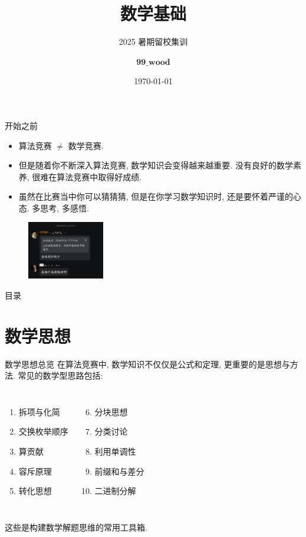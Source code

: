 \documentclass[aspectratio=169]{beamer}  %
\title{数学基础}
\subtitle{2025 暑期留校集训}
\author{$\mathbf{99\_wood}$}
\institute{东北大学\\计算机科学与工程学院}
\date{\today}
\newcommand{\pau}{\pause}
\begin{document}
\begin{frame}
  \titlepage
\end{frame}

\begin{frame}{开始之前}
  \pau
  \begin{itemize}
    \item 算法竞赛 $\neq$ 数学竞赛. \pau
    \item 但是随着你不断深入算法竞赛, 数学知识会变得越来越重要. 没有良好的数学素养, 很难在算法竞赛中取得好成绩. \pau
    \item 虽然在比赛当中你可以猜猜猜, 但是在你学习数学知识时,
          还是要怀着严谨的心态. 多思考, 多感悟.
  \end{itemize}
  \begin{figure}
    \centering
    \includegraphics[width=0.3\textwidth]{./figure/gaoduanjv.jpg}
  \end{figure}
\end{frame}

\begin{frame}{目录}
  \tableofcontents
\end{frame}

\section{数学思想}

\begin{frame}{数学思想总览}
在算法竞赛中, 数学知识不仅仅是公式和定理, 更重要的是\alert{思想与方法}.
常见的数学型思路包括: 
\begin{columns}[t]
    \begin{enumerate}
        \item 拆项与化简
        \item 交换枚举顺序
        \item 算贡献
        \item 容斥原理
        \item 转化思想
    \end{enumerate}

    \begin{enumerate}
        \setcounter{enumi}{5}
        \item 分块思想
        \item 分类讨论
        \item 利用单调性
        \item 前缀和与差分
        \item 二进制分解
    \end{enumerate}
\end{columns}

\vspace{1em}

这些是构建数学解题思维的常用工具箱. 
\end{frame}
\end{document}
